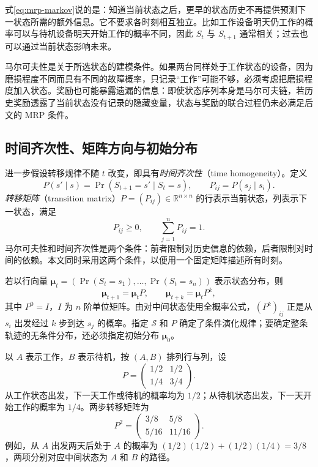 \documentclass[UTF8,12pt,a4paper,fontset=fandol]{ctexart}
\begin{document}
式\eqref{eq:mrp-markov}说的是：知道当前状态之后，更早的状态历史不再提供预测下一状态所需的额外信息。它不要求各时刻相互独立。比如工作设备明天仍工作的概率可以与待机设备明天开始工作的概率不同，因此 $S_t$ 与 $S_{t+1}$ 通常相关；过去也可以通过当前状态影响未来。

马尔可夫性是关于所选状态的建模条件。如果两台同样处于工作状态的设备，因为磨损程度不同而具有不同的故障概率，只记录“工作”可能不够，必须考虑把磨损程度加入状态。奖励也可能暴露遗漏的信息：即使状态序列本身是马尔可夫链，若历史奖励透露了当前状态没有记录的隐藏变量，状态与奖励的联合过程仍未必满足后文的 MRP 条件。

\subsection{时间齐次性、矩阵方向与初始分布}

进一步假设转移规律不随 $t$ 改变，即具有\emph{时间齐次性}（time homogeneity）。定义
\begin{equation}
  P(s'\mid s)=\Pr(S_{t+1}=s'\mid S_t=s),\qquad
  P_{ij}=P(s_j\mid s_i).
  \label{eq:mrp-transition}
\end{equation}
\emph{转移矩阵}（transition matrix）$P=(P_{ij})\in\mathbb R^{n\times n}$ 的行表示当前状态，列表示下一状态，满足
\[
  P_{ij}\geq0,\qquad \sum_{j=1}^{n}P_{ij}=1.
\]
马尔可夫性和时间齐次性是两个条件：前者限制对历史信息的依赖，后者限制对时间的依赖。本文同时采用这两个条件，以便用一个固定矩阵描述所有时刻。

若以行向量 $\boldsymbol\mu_t=(\Pr(S_t=s_1),\ldots,\Pr(S_t=s_n))$ 表示状态分布，则
\begin{equation}
  \boldsymbol\mu_{t+1}=\boldsymbol\mu_tP,\qquad
  \boldsymbol\mu_{t+k}=\boldsymbol\mu_tP^k,
  \label{eq:mrp-distribution}
\end{equation}
其中 $P^0=I$，$I$ 为 $n$ 阶单位矩阵。由对中间状态使用全概率公式，$(P^k)_{ij}$ 正是从 $s_i$ 出发经过 $k$ 步到达 $s_j$ 的概率。指定 $\mathcal S$ 和 $P$ 确定了条件演化规律；要确定整条轨迹的无条件分布，还必须指定初始分布 $\boldsymbol\mu_0$。

\begin{example}[贯穿全文的两状态模型]
\label{ex:mrp-model}
以 $A$ 表示工作，$B$ 表示待机，按 $(A,B)$ 排列行与列，设
\begin{equation}
  P=\begin{pmatrix}1/2&1/2\\1/4&3/4\end{pmatrix}.
  \label{eq:mrp-example-p}
\end{equation}
从工作状态出发，下一天工作或待机的概率均为 $1/2$；从待机状态出发，下一天开始工作的概率为 $1/4$。两步转移矩阵为
\[
  P^2=\begin{pmatrix}3/8&5/8\\5/16&11/16\end{pmatrix}.
\]
例如，从 $A$ 出发两天后处于 $A$ 的概率为 $(1/2)(1/2)+(1/2)(1/4)=3/8$，两项分别对应中间状态为 $A$ 和 $B$ 的路径。
\end{example}
\end{document}
